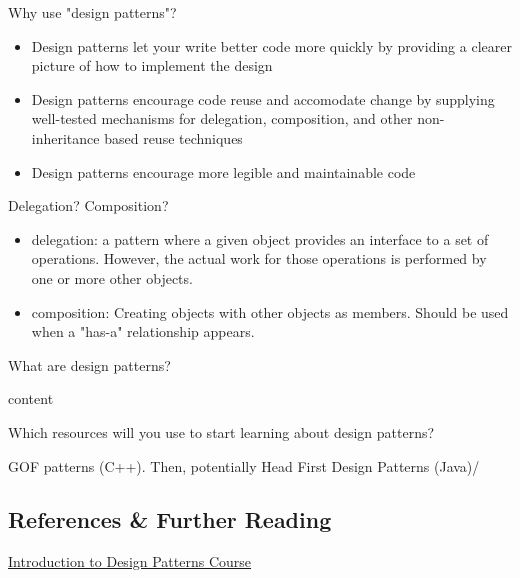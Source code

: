 \begin{quest}
\item Why use "design patterns"?
\begin{ans}
\begin{itemize}
	\item Design patterns let your write better code more quickly by providing a clearer picture of how to implement the design
	\item Design patterns encourage code reuse and accomodate change by supplying well-tested mechanisms for delegation, composition, and other non-inheritance based reuse techniques
	\item Design patterns encourage more legible and maintainable code
\end{itemize}
\end{ans}

\item Delegation? Composition?
\begin{ans}
\begin{itemize}
	\item delegation: a pattern where a given object provides an interface to a set of operations. However, the actual work for those operations is performed by one or more other objects.
	\item composition: Creating objects with other objects as members. Should be used when a "has-a" relationship appears.
\end{itemize}
\end{ans}

\item What are design patterns?
\begin{ans}
	content

\end{ans}

\item Which resources will you use to start learning about design patterns?
\begin{ans}
	GOF patterns (C++). Then, potentially Head First Design Patterns (Java)/
\end{ans}
\end{quest}

\subsection{References \& Further Reading}

\href{https://www.gofpatterns.com/design-patterns/module1/intro-design-patterns.php}{Introduction to Design Patterns Course}
